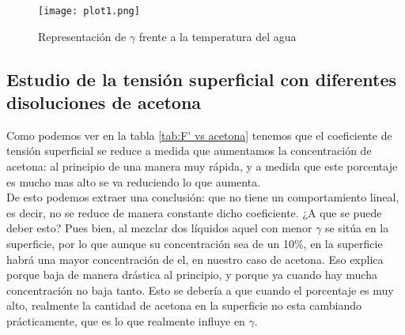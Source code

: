 \documentclass[10pt,a4paper]{article}
\begin{document}
\begin{figure}[h!]
\centering
\texttt{[image: plot1.png]}
\caption{Representación de $\gamma$ frente a la temperatura del agua}
\label{fig:plot1}
\end{figure}

\newpage

\subsection{Estudio de la tensión superficial con diferentes disoluciones de acetona}
Como podemos ver en la tabla \ref{tab:F' vs acetona} tenemos que el coeficiente de tensión superficial se reduce a medida que aumentamos la concentración de acetona: al principio de una manera muy rápida, y a medida que este porcentaje es mucho mas alto se va reduciendo lo que aumenta. \\

De esto podemos extraer una conclusión: que no tiene un comportamiento lineal, es decir, no se reduce de manera constante dicho coeficiente. ¿A que se puede deber esto? Pues bien, al mezclar dos líquidos aquel con menor $\gamma$ se sitúa en la superficie,  por lo que aunque su concentración sea de un 10\%, en la superficie habrá una mayor concentración de el, en nuestro caso de acetona. Eso explica porque baja de manera drástica al principio, y porque ya cuando hay mucha concentración no baja tanto. Esto se debería a que cuando el porcentaje es muy alto, realmente la cantidad de acetona en la superficie no esta cambiando prácticamente, que es lo que realmente influye en $\gamma$. \\
\end{document}
